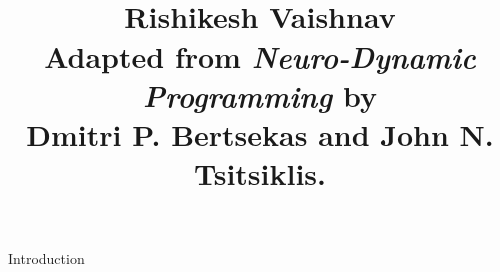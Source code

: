 \documentclass{rl_theory/rl_theory}
\begin{document}
\title{
\\
\vspace{10pt}
\large 
Rishikesh Vaishnav\\ 
\vspace{10pt}
\normalsize 
Adapted from
{\it Neuro-Dynamic Programming}
by \\
Dmitri P. Bertsekas
and
John N. Tsitsiklis.
}
\maketitle

\begin{part} {Introduction}
\end{part}
\end{document}
